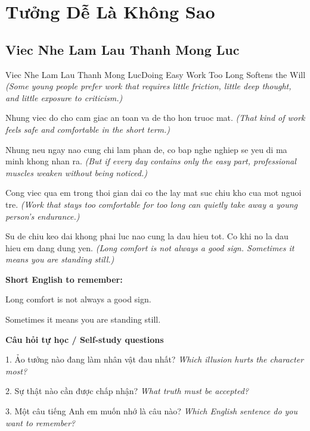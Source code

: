 \chapter{Tưởng Dễ Là Không Sao}

\section{Viec Nhe Lam Lau Thanh Mong Luc}
\begin{truyen}{Viec Nhe Lam Lau Thanh Mong Luc}{Doing Easy Work Too Long Softens the Will}
\textit{(Some young people prefer work that requires little friction, little deep thought, and little exposure to criticism.)}

Nhung viec do cho cam giac an toan va de tho hon truoc mat.
\textit{(That kind of work feels safe and comfortable in the short term.)}

Nhung neu ngay nao cung chi lam phan de, co bap nghe nghiep se yeu di ma minh khong nhan ra.
\textit{(But if every day contains only the easy part, professional muscles weaken without being noticed.)}

Cong viec qua em trong thoi gian dai co the lay mat suc chiu kho cua mot nguoi tre.
\textit{(Work that stays too comfortable for too long can quietly take away a young person’s endurance.)}

\end{truyen}

\begin{baihoc}
Su de chiu keo dai khong phai luc nao cung la dau hieu tot. Co khi no la dau hieu em dang dung yen.
\textit{(Long comfort is not always a good sign. Sometimes it means you are standing still.)}
\end{baihoc}

\begin{ghinhoanh}
\textbf{Short English to remember:}

Long comfort is not always a good sign.

Sometimes it means you are standing still.

\end{ghinhoanh}

\begin{tuhocnhanh}
\textbf{Câu hỏi tự học / Self-study questions}

1. Ảo tưởng nào đang làm nhân vật đau nhất? \textit{Which illusion hurts the character most?}

2. Sự thật nào cần được chấp nhận? \textit{What truth must be accepted?}

3. Một câu tiếng Anh em muốn nhớ là câu nào? \textit{Which English sentence do you want to remember?}
\end{tuhocnhanh}
\ngancach

